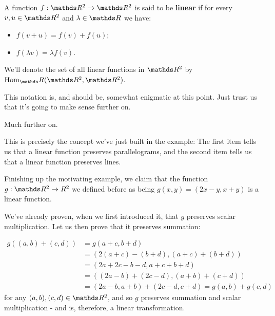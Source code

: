 \begin{df}
	A function $f:\R^2\to\R^2$ is said to be \textbf{linear} if for every $v,u\in \R^2$ and $\lambda\in \R$ we have:
	\begin{itemize}
		\item $f(v+u)=f(v)+f(u)$;
		\item $f(\lambda v)=\lambda f(v)$.
	\end{itemize}

	We'll denote the set of all linear functions in $\R^2$ by $\hom_\R(\R^2,\R^2)$.
\end{df}

\begin{rmk}
	This notation is, and should be, somewhat enigmatic at this point. Just trust us that it's going to make sense further on.
	
	Much further on.
\end{rmk}

This is precisely the concept we've just built in the example: The first item tells us that a linear function preserves parallelograms, and the second item tells us that a linear function preserves lines.

\begin{ex}
	Finishing up the motivating example, we claim that the function $g:\R^2\to R^2$ we defined before as being $g(x,y)=(2x-y,x+y)$ is a linear function.
	
	We've already proven, when we first introduced it, that $g$ preserves scalar multiplication. Let us then prove that it preserves summation:
	
	\begin{align*}
		g((a,b)+(c,d))&=g(a+c,b+d)\\
		&=(2(a+c)-(b+d),(a+c)+(b+d))\\
		&=(2a+2c-b-d,a+c+b+d)\\
		&=((2a-b)+(2c-d),(a+b)+(c+d))\\
		&=(2a-b,a+b)+(2c-d,c+d)=g(a,b)+g(c,d)
	\end{align*}for any $(a,b),(c,d)\in \R^2$, and so $g$ preserves summation and scalar multiplication - and is, therefore, a linear transformation.
\end{ex}

